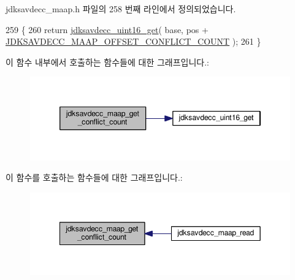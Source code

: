 jdksavdecc\+\_\+maap.\+h 파일의 258 번째 라인에서 정의되었습니다.


\begin{DoxyCode}
259 \{
260     \textcolor{keywordflow}{return} \hyperlink{group__endian_ga3fbbbc20be954aa61e039872965b0dc9}{jdksavdecc\_uint16\_get}( base, pos + 
      \hyperlink{group__maap_gaccacf622b27f9b634ddcf04f09ee2e91}{JDKSAVDECC\_MAAP\_OFFSET\_CONFLICT\_COUNT} );
261 \}
\end{DoxyCode}


이 함수 내부에서 호출하는 함수들에 대한 그래프입니다.\+:
\nopagebreak
\begin{figure}[H]
\begin{center}
\leavevmode
\includegraphics[width=346pt]{group__maap_ga5ee187eaa19bfb46348ecb21ed2445a6_cgraph}
\end{center}
\end{figure}




이 함수를 호출하는 함수들에 대한 그래프입니다.\+:
\nopagebreak
\begin{figure}[H]
\begin{center}
\leavevmode
\includegraphics[width=349pt]{group__maap_ga5ee187eaa19bfb46348ecb21ed2445a6_icgraph}
\end{center}
\end{figure}


